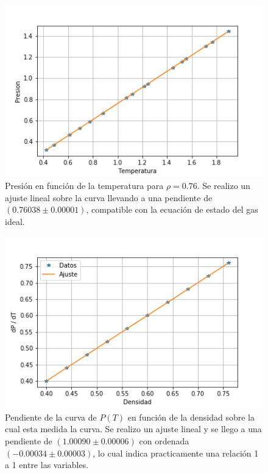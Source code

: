\documentclass[%
 reprint,
 amsmath,amssymb,
 aps,
]{revtex4-1}
\begin{document}
\begin{figure}
  \begin{center}
  \includegraphics[scale=0.62]{images/presion_vs_t.png}
  \caption{Presi\'on en funci\'on de la temperatura para $\rho = 0.76$. Se
  realizo un ajuste lineal sobre la curva llevando a una pendiente de
  $(0.76038 \pm 0.00001)$, compatible con la ecuaci\'on de estado del gas
  ideal.}
  \label{presion_vs_t}
\end{center}
\end{figure}

\begin{figure}
  \begin{center}
  \includegraphics[scale=0.62]{images/pendientes_vs_rhos.png}
  \caption{Pendiente de la curva de $P(T)$ en funci\'on de la densidad sobre la
  cual esta medida la curva. Se realizo un ajuste lineal y se llego a una
  pendiente de $(1.00090 \pm 0.00006)$ con ordenada $(-0.00034 \pm 0.00003)$,
  lo cual indica practicamente una relaci\'on 1 a 1 entre las variables.}
  \label{presion_vs_t}
\end{center}
\end{figure}
\end{document}
